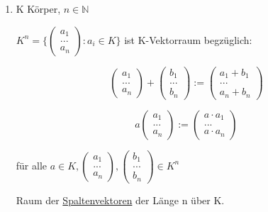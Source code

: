 \documentclass[a4paper, openany]{book}
\begin{document}
    \begin{enumerate}[label=(\alph*)]
      \item K Körper, $n \in \mathbb{N}$

      $K^n = \{\begin{pmatrix}a_1 \\ ... \\ a_n \end{pmatrix} : a_i \in K\}$ ist K-Vektorraum begzüglich:

      \begin{equation}
        \begin{pmatrix}a_1 \\ ... \\ a_n \end{pmatrix} + \begin{pmatrix}b_1 \\ ... \\ b_n \end{pmatrix} := \begin{pmatrix}a_1 + b_1 \\ ... \\ a_n + b_n \end{pmatrix}
      \end{equation}

      \begin{equation}
        a \begin{pmatrix}a_1 \\ ... \\ a_n \end{pmatrix} := \begin{pmatrix} a \cdot a_1 \\ ... \\ a \cdot a_n \end{pmatrix}
      \end{equation}

      für alle $a \in K, \begin{pmatrix}a_1 \\ ... \\ a_n \end{pmatrix}, \begin{pmatrix}b_1 \\ ... \\ b_n \end{pmatrix} \in K^n$

      Raum der \underline{Spaltenvektoren} der Länge n über K.

      \par \medskip


\end{enumerate}
\end{document}
